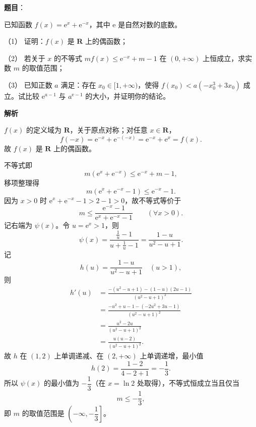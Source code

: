 \begin{answer}

\textbf{题目}：

已知函数 $f(x)=\mathrm e^x+\mathrm e^{-x}$，其中 $\mathrm e$ 是自然对数的底数。

（1） 证明：$f(x)$ 是 $\mathbf R$ 上的偶函数；

（2） 若关于 $x$ 的不等式 $mf(x)\leqslant \mathrm e^{-x}+m-1$ 在 $(0,+\infty)$ 上恒成立，求实数 $m$ 的取值范围；

（3） 已知正数 $a$ 满足：存在 $x_0\in[1,+\infty)$，使得 $f(x_0)<a\left(-x_0^3+3x_0\right)$ 成立。试比较 $\mathrm e^{a-1}$ 与 $a^{\mathrm e-1}$ 的大小，并证明你的结论。

\textbf{解析}


$f(x)$ 的定义域为 $\mathbf R$，关于原点对称；对任意 $x\in\mathbf R$，
\nopagebreak[4]
\[f(-x)=\mathrm e^{-x}+\mathrm e^{-(-x)}=\mathrm e^{-x}+\mathrm e^{x}=f(x).\]
故 $f(x)$ 是 $\mathbf R$ 上的偶函数。


不等式即
\nopagebreak[4]
\[m\left(\mathrm e^x+\mathrm e^{-x}\right)\leqslant \mathrm e^{-x}+m-1,\]
移项整理得
\nopagebreak[4]
\[m\left(\mathrm e^x+\mathrm e^{-x}-1\right)\leqslant \mathrm e^{-x}-1.\]
因为 $x>0$ 时 $\mathrm e^x+\mathrm e^{-x}-1>2-1>0$，故不等式等价于
\nopagebreak[4]
\[m\leqslant\frac{\mathrm e^{-x}-1}{\mathrm e^x+\mathrm e^{-x}-1}\qquad(\forall x>0).\]
记右端为 $\psi(x)$。令 $u=\mathrm e^x>1$，则
\nopagebreak[4]
\[\psi(x)=\frac{\frac1u-1}{u+\frac1u-1}=\frac{1-u}{u^2-u+1}.\]
记
\nopagebreak[4]
\[h(u)=\frac{1-u}{u^2-u+1}\quad(u>1),\]
则
\nopagebreak[4]
\[\begin{aligned}
h'(u)&=\frac{-(u^2-u+1)-(1-u)(2u-1)}{(u^2-u+1)^2}\\
&=\frac{-u^2+u-1-\left(-2u^2+3u-1\right)}{(u^2-u+1)^2}\\
&=\frac{u^2-2u}{(u^2-u+1)^2}\\
&=\frac{u(u-2)}{(u^2-u+1)^2}.
\end{aligned}\]
故 $h$ 在 $(1,2)$ 上单调递减、在 $(2,+\infty)$ 上单调递增，最小值
\nopagebreak[4]
\[h(2)=\frac{1-2}{4-2+1}=-\frac13.\]
所以 $\psi(x)$ 的最小值为 $-\dfrac13$（在 $x=\ln2$ 处取得），不等式恒成立当且仅当
\nopagebreak[4]
\[m\leqslant-\frac13,\]
即 $m$ 的取值范围是 $\left(-\infty,-\dfrac13\right]$。


\end{answer}
